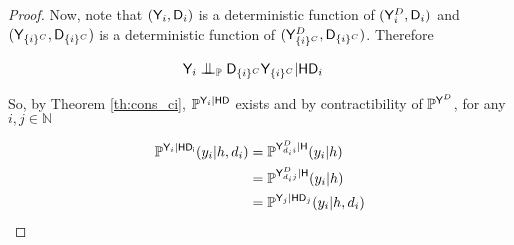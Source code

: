 \begin{proof}
Now, note that $(\mathsf{Y}_i,\mathsf{D}_i)$ is a deterministic function of $(\mathsf{Y}^D_{i},\mathsf{D}_i)$ and $(\mathsf{Y}_{\{i\}^C},\mathsf{D}_{\{i\}^C})$ is a deterministic function of $(\mathsf{Y}^D_{\{i\}^C},\mathsf{D}_{\{i\}^C})$. Therefore

\begin{align}
    &\RV{Y}_i \CI_{\prob{P}} \RV{D}_{\{i\}^C}\RV{Y}_{\{i\}^C} |\RV{H}\RV{D}_i&
\end{align}

So, by Theorem \ref{th:cons_ci}, $\mathbb{P}^{\mathsf{Y}_i|\mathsf{HD}}$ exists and by contractibility of $\mathbb{P}^{\mathsf{Y}^D}$, for any $i,j\in\mathbb{N}$

\begin{align}
    \mathbb{P}^{\mathsf{Y}_i|\mathsf{HD_i}}(y_i|h,d_i) &= \mathbb{P}^{\mathsf{Y}^D_{d_i i}|\mathsf{H}}(y_i|h) \\
    &= \mathbb{P}^{\mathsf{Y}^D_{d_i j}|\mathsf{H}}(y_i|h)\\
    &= \mathbb{P}^{\mathsf{Y}_j|\mathsf{HD}_j}(y_i|h,d_i)
\end{align}
\end{proof}
